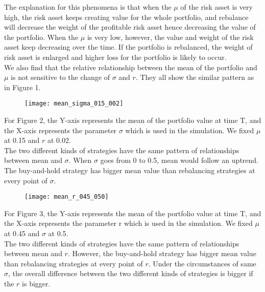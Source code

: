 \documentclass[
10pt, %
a4paper, %
oneside, %
headinclude,footinclude, %
BCOR5mm, %
]{scrartcl}
\begin{document}
The explanation for this phenomena is that when the $\mu$ of the risk asset is very high, the risk asset keeps creating value for the whole portfolio, and rebalance will decrease the weight of the profitable risk asset hence decreasing the value of the portfolio. When the $\mu$ is very low, however, the value and weight of the risk asset keep decreasing over the time. If the portfolio is rebalanced, the weight of risk asset is enlarged and higher loss for the portfolio is likely to occur.\\

We also find that the relative relationship between the mean of the portfolio and $\mu$ is not sensitive to the change of $\sigma$ and $r$. They all show the similar pattern as in Figure 1.\\

\begin{figure}[H]
	\centering
	\texttt{[image: mean\_sigma\_015\_002]}
	\caption{}
	\label{fig:meansigma015002}
\end{figure}
For Figure 2, the Y-axis represents the mean of the portfolio value at time T, and the X-axis represents the parameter $\sigma$ which is used in the simulation. We fixed $\mu$ at 0.15 and $r$ at 0.02.\\

The two different kinds of strategies have the same pattern of relationships between mean and $\sigma$. When $\sigma$ goes from 0 to 0.5, mean would follow an uptrend. The buy-and-hold strategy has bigger mean value than rebalancing strategies at every point of $\sigma$. \\

\begin{figure}[H]
	\centering
	\texttt{[image: mean\_r\_045\_050]}
	\caption{}
	\label{fig:meanr045050}
\end{figure}

For Figure 3, the Y-axis represents the mean of the portfolio value at time T, and the X-axis represents the parameter r which is used in the simulation. We fixed $\mu$ at 0.45 and $\sigma$ at 0.5.\\

The two different kinds of strategies have the same pattern of relationships between mean and $r$. However, the buy-and-hold strategy has bigger mean value than rebalancing strategies at every point of $r$. Under the circumstances of same $\sigma$, the overall difference between the two different kinds of strategies is bigger if the $r$ is bigger. \\
\end{document}
